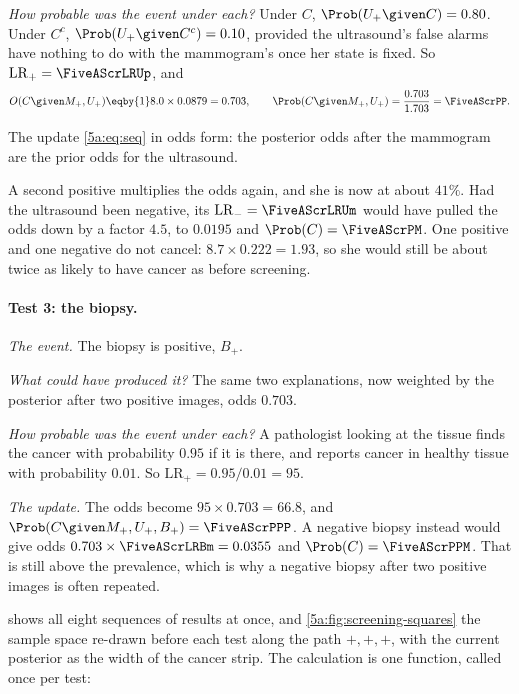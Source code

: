 \emph{How probable was the event under each?} Under $C$, $\Prob(U_+\given C)=0.80$.
Under $C^c$, $\Prob(U_+\given C^c)=0.10$, provided the ultrasound's false alarms have
nothing to do with the mammogram's once her state is fixed. So
$\mathrm{LR}_+=\FiveAScrLRUp$, and
\begin{align*}
  O(C\given M_+,U_+)
  \eqby{1}8.0\times0.0879=0.703,
  \qquad
  \Prob(C\given M_+,U_+)=\frac{0.703}{1.703}=\FiveAScrPP .
\end{align*}
\begin{explain}
  \item The update \eqref{5a:eq:seq} in odds form: the posterior odds after the
        mammogram are the prior odds for the ultrasound.
\end{explain}
A second positive multiplies the odds again, and she is now at about $41\%$. Had the
ultrasound been negative, its $\mathrm{LR}_-=\FiveAScrLRUm$ would have pulled the odds
down by a factor $4.5$, to $0.0195$ and $\Prob(C)=\FiveAScrPM$. One positive and one
negative do not cancel: $8.7\times0.222=1.93$, so she would still be about twice as
likely to have cancer as before screening.

\paragraph{Test 3: the biopsy.}
\emph{The event.} The biopsy is positive, $B_+$.

\emph{What could have produced it?} The same two explanations, now weighted by the
posterior after two positive images, odds $0.703$.

\emph{How probable was the event under each?} A pathologist looking at the tissue
finds the cancer with probability $0.95$ if it is there, and reports cancer in
healthy tissue with probability $0.01$. So $\mathrm{LR}_+=0.95/0.01=95$.

\emph{The update.} The odds become $95\times0.703=66.8$, and
$\Prob(C\given M_+,U_+,B_+)=\FiveAScrPPP$. A negative biopsy instead would give odds
$0.703\times\FiveAScrLRBm=0.0355$ and $\Prob(C)=\FiveAScrPPM$. That is still above
the prevalence, which is why a negative biopsy after two positive images is often
repeated.

 shows all eight sequences of results at once, and
\cref{5a:fig:screening-squares} the sample space re-drawn before each test along the path
$+,+,+$, with the current posterior as the width of the cancer strip. The calculation
is one function, called once per test:

